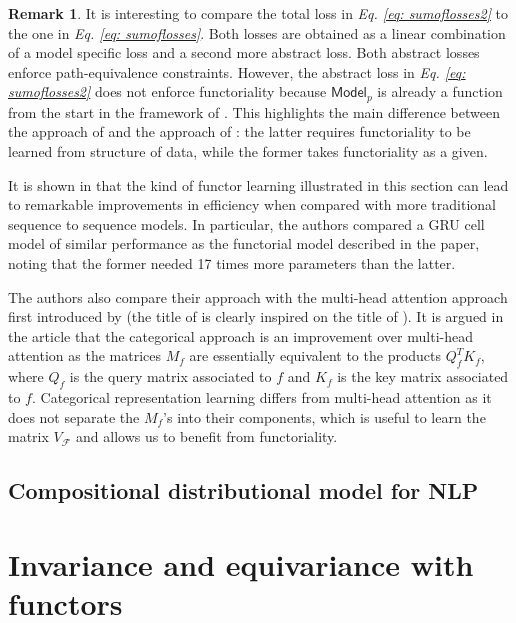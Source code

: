 \documentclass[11pt,a4paper,openright,twoside]{report}
\theoremstyle{plain}
\theoremstyle{definition}
\newtheorem{remark}[proposition]{Remark}
\begin{document}
\begin{remark}
  It is interesting to compare the total loss in \textit{Eq. \ref{eq: sumoflosses2}} to the one in \textit{Eq. \ref{eq: sumoflosses}}. Both losses are obtained as a linear combination of a model specific loss and a second more abstract loss. Both abstract losses enforce path-equivalence constraints. However, the abstract loss in \textit{Eq. \ref{eq: sumoflosses2}} does not enforce functoriality because $\mathsf{Model}_p$ is already a function from the start in the framework of \cite{gavranovic2019compositional}. This highlights the main difference between the approach of \cite{gavranovic2019compositional} and the approach of \cite{sheshmani2021categorical}: the latter requires functoriality to be learned from structure of data, while the former takes functoriality as a given.
\end{remark}


It is shown in \cite{sheshmani2021categorical} that the kind of functor learning illustrated in this section can lead to remarkable improvements in efficiency when compared with more traditional sequence to sequence models. In particular, the authors compared a GRU cell model of similar performance as the functorial model described in the paper, noting that the former needed 17 times more parameters than the latter.


The authors also compare their approach with the multi-head attention approach first introduced by \cite{vaswani2017attention} (the title of \cite{sheshmani2021categorical} is clearly inspired on the title of \cite{vaswani2017attention}). It is argued in the article that the categorical approach is an improvement over multi-head attention as the matrices $M_f$ are essentially equivalent to the products $Q_f^TK_f$, where $Q_f$ is the query matrix associated to $f$ and $K_f$ is the key matrix associated to $f$. Categorical representation learning differs from multi-head attention as it does not separate the $M_f$'s into their components, which is useful to learn the matrix $V_{\mathcal{F}}$ and allows us to benefit from functoriality. 



\subsection{Compositional distributional model for NLP}



\section{Invariance and equivariance with functors}
\end{document}

